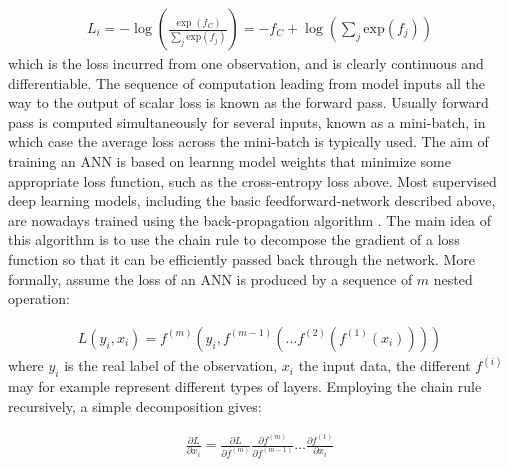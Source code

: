 \documentclass{report}
\begin{document}
\begin{align} \label{XEloss}
  L_i  = -\log \left(\frac{\exp (f_C)}{\sum_j \text{exp}(f_j)}\right) = -f_C + \log\left(\sum_j \text{exp}(f_j)\right)
\end{align}
which is the loss incurred from one observation, and is clearly continuous and differentiable. The sequence of computation leading from model inputs all the way to the output of scalar loss is known as the forward pass. Usually forward pass is computed simultaneously for several inputs, known as a mini-batch, in which case the average loss across the mini-batch is typically used. 
The aim of training an ANN is based on learnng model weights that minimize some appropriate loss function, such as the cross-entropy loss above. Most supervised deep learning models, including the basic feedforward-network described above, are nowadays trained using the back-propagation algorithm \cite{Linnainmaa1976} \cite{Rumelhart1985}. The main idea of this algorithm is to use the chain rule to decompose the gradient of a loss function so that it can be efficiently passed back through the network. More formally, assume the loss of an ANN is produced by a sequence of $m$ nested operation:

\begin{align} \label{bp_eq1}
  L(y_i, x_i) = f^{(m)}(y_i, f^{(m-1)}(\dots f^{(2)}(f^{(1)}(x_i))))
\end{align}
where $y_i$ is the real label of the observation, $x_i$ the input data, the different $f^{(i)}$ may for example represent different types of layers. Employing the chain rule recursively, a simple decomposition gives:

\begin{align} \label{bp_crule}
  \frac{\partial L}{\partial x_i} = \frac{\partial L}{\partial f^{(m)}}\frac{\partial f^{(m)}}{\partial f^{(m-1)}} \dots \frac{\partial f^{(1)}}{\partial x_i}
\end{align}
\end{document}
